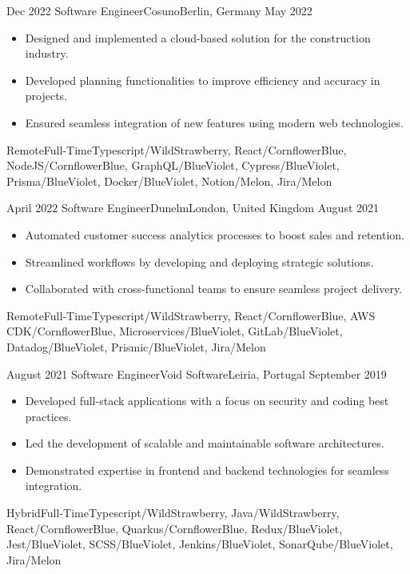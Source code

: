 \begin{experiences}
  \emptySeparator

  \experience
  {Dec 2022} {Software Engineer}{Cosuno}{Berlin, Germany}
  {May 2022}{\begin{itemize}
    \item Designed and implemented a cloud-based solution for the construction industry.
    \item Developed planning functionalities to improve efficiency and accuracy in projects.
    \item Ensured seamless integration of new features using modern web technologies.
  \end{itemize}}
  {Remote}{Full-Time}{Typescript/WildStrawberry, React/CornflowerBlue, NodeJS/CornflowerBlue, GraphQL/BlueViolet, Cypress/BlueViolet, Prisma/BlueViolet, Docker/BlueViolet, Notion/Melon, Jira/Melon}

  \emptySeparator

  \experience
  {April 2022} {Software Engineer}{Dunelm}{London, United Kingdom}
  {August 2021}{\begin{itemize}
    \item Automated customer success analytics processes to boost sales and retention.
    \item Streamlined workflows by developing and deploying strategic solutions.
    \item Collaborated with cross-functional teams to ensure seamless project delivery.
  \end{itemize}}
  {Remote}{Full-Time}{Typescript/WildStrawberry, React/CornflowerBlue, AWS CDK/CornflowerBlue, Microservices/BlueViolet, GitLab/BlueViolet, Datadog/BlueViolet, Prismic/BlueViolet, Jira/Melon}

  \emptySeparator

  \experience
  {August 2021} {Software Engineer}{Void Software}{Leiria, Portugal}
  {September 2019}{\begin{itemize}
    \item Developed full-stack applications with a focus on security and coding best practices.
    \item Led the development of scalable and maintainable software architectures.
    \item Demonstrated expertise in frontend and backend technologies for seamless integration.
  \end{itemize}}
  {Hybrid}{Full-Time}{Typescript/WildStrawberry, Java/WildStrawberry, React/CornflowerBlue, Quarkus/CornflowerBlue, Redux/BlueViolet, Jest/BlueViolet, SCSS/BlueViolet, Jenkins/BlueViolet, SonarQube/BlueViolet, Jira/Melon}


\end{experiences}
